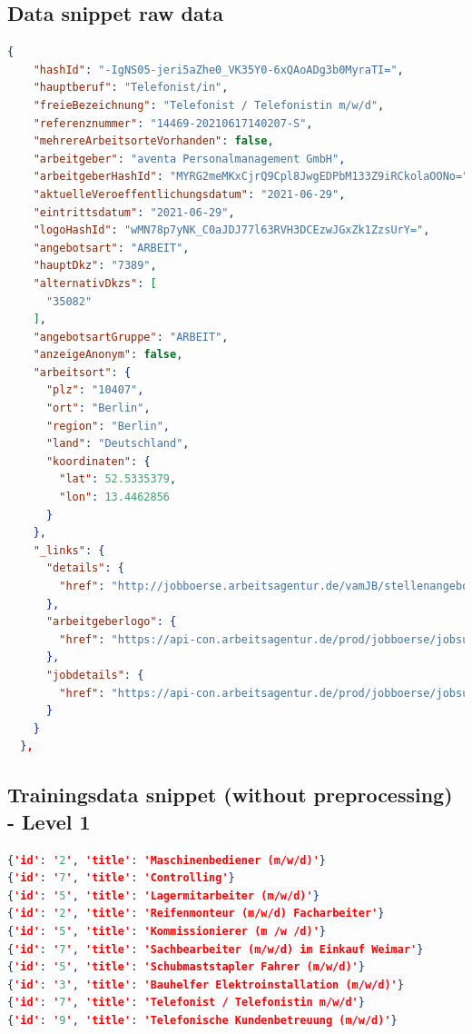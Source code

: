 \documentclass[12pt, a4paper, titlepage]{article}
\begin{document}
\subsection{Data snippet raw data}
\begin{lstlisting}[language=json]
  {
    "hashId": "-IgNS05-jeri5aZhe0_VK35Y0-6xQAoADg3b0MyraTI=",
    "hauptberuf": "Telefonist/in",
    "freieBezeichnung": "Telefonist / Telefonistin m/w/d",
    "referenznummer": "14469-20210617140207-S",
    "mehrereArbeitsorteVorhanden": false,
    "arbeitgeber": "aventa Personalmanagement GmbH",
    "arbeitgeberHashId": "MYRG2meMKxCjrQ9Cpl8JwgEDPbM133Z9iRCkolaOONo=",
    "aktuelleVeroeffentlichungsdatum": "2021-06-29",
    "eintrittsdatum": "2021-06-29",
    "logoHashId": "wMN78p7yNK_C0aJDJ77l63RVH3DCEzwJGxZk1ZzsUrY=",
    "angebotsart": "ARBEIT",
    "hauptDkz": "7389",
    "alternativDkzs": [
      "35082"
    ],
    "angebotsartGruppe": "ARBEIT",
    "anzeigeAnonym": false,
    "arbeitsort": {
      "plz": "10407",
      "ort": "Berlin",
      "region": "Berlin",
      "land": "Deutschland",
      "koordinaten": {
        "lat": 52.5335379,
        "lon": 13.4462856
      }
    },
    "_links": {
      "details": {
        "href": "http://jobboerse.arbeitsagentur.de/vamJB/stellenangebotAnzeigen.html?bencs=xZ8NQKDByg2g6avJgLLIrGwqlXZQi1GKNAI%2BzAoCWJ5RD6egZDnwqMFj%2B4AnUX6XN5nyEJ7NKSdBBr1EvlmnVw%3D%3D"
      },
      "arbeitgeberlogo": {
        "href": "https://api-con.arbeitsagentur.de/prod/jobboerse/jobsuche-service/ed/v1/arbeitgeberlogo/wMN78p7yNK_C0aJDJ77l63RVH3DCEzwJGxZk1ZzsUrY="
      },
      "jobdetails": {
        "href": "https://api-con.arbeitsagentur.de/prod/jobboerse/jobsuche-service/pc/v1/jobdetails/-IgNS05-jeri5aZhe0_VK35Y0-6xQAoADg3b0MyraTI="
      }
    }
  },
\end{lstlisting}


\subsection{Trainingsdata snippet (without preprocessing) - Level 1}
\begin{lstlisting}[language=json, firstnumber=1]
{'id': '2', 'title': 'Maschinenbediener (m/w/d)'}
{'id': '7', 'title': 'Controlling'}
{'id': '5', 'title': 'Lagermitarbeiter (m/w/d)'}
{'id': '2', 'title': 'Reifenmonteur (m/w/d) Facharbeiter'}
{'id': '5', 'title': 'Kommissionierer (m /w /d)'}
{'id': '7', 'title': 'Sachbearbeiter (m/w/d) im Einkauf Weimar'}
{'id': '5', 'title': 'Schubmaststapler Fahrer (m/w/d)'}
{'id': '3', 'title': 'Bauhelfer Elektroinstallation (m/w/d)'}
{'id': '7', 'title': 'Telefonist / Telefonistin m/w/d'}
{'id': '9', 'title': 'Telefonische Kundenbetreuung (m/w/d)'}
\end{lstlisting}
\end{document}
